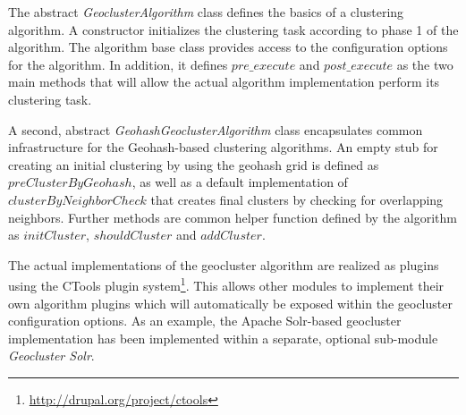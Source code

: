 The abstract \textit{GeoclusterAlgorithm} class defines the basics of a clustering algorithm. A constructor initializes the clustering task according to phase 1 of the algorithm. The algorithm base class provides access to the configuration options for the algorithm. In addition, it defines $pre\_execute$ and $post\_execute$ as the two main methods that will allow the actual algorithm implementation perform its clustering task.

A second, abstract \textit{GeohashGeoclusterAlgorithm} class encapsulates common infrastructure for the Geohash-based clustering algorithms. An empty stub for creating an initial clustering by using the geohash grid is defined as $preClusterByGeohash$, as well as a default implementation of $clusterByNeighborCheck$ that creates final clusters by checking for overlapping neighbors. Further methods are common helper function defined by the algorithm as $initCluster$, $shouldCluster$ and $addCluster$.

The actual implementations of the geocluster algorithm are realized as plugins using the CTools plugin system\footnote{\url{http://drupal.org/project/ctools}}. This allows other modules to implement their own algorithm plugins which will automatically be exposed within the geocluster configuration options. As an example, the Apache Solr-based geocluster implementation has been implemented within a separate, optional sub-module \textit{Geocluster Solr}. 

